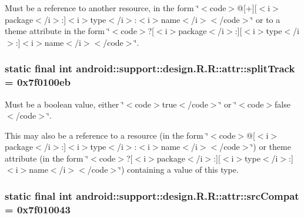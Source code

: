 Must be a reference to another resource, in the form \char`\"{}$<$code$>$@\mbox{[}+\mbox{]}\mbox{[}$<$i$>$package$<$/i$>$:\mbox{]}$<$i$>$type$<$/i$>$:$<$i$>$name$<$/i$>$$<$/code$>$\char`\"{} or to a theme attribute in the form \char`\"{}$<$code$>$?\mbox{[}$<$i$>$package$<$/i$>$:\mbox{]}\mbox{[}$<$i$>$type$<$/i$>$:\mbox{]}$<$i$>$name$<$/i$>$$<$/code$>$\char`\"{}. \hypertarget{classandroid_1_1support_1_1design_1_1_r_1_1attr_e6070dcae3cf89966842cef8a066bdf4}{
\subsubsection[{splitTrack}]{\setlength{\rightskip}{0pt plus 5cm}static final int android::support::design.R.R::attr::splitTrack = 0x7f0100eb}}
\label{classandroid_1_1support_1_1design_1_1_r_1_1attr_e6070dcae3cf89966842cef8a066bdf4}


Must be a boolean value, either \char`\"{}$<$code$>$true$<$/code$>$\char`\"{} or \char`\"{}$<$code$>$false$<$/code$>$\char`\"{}. 

This may also be a reference to a resource (in the form \char`\"{}$<$code$>$@\mbox{[}$<$i$>$package$<$/i$>$:\mbox{]}$<$i$>$type$<$/i$>$:$<$i$>$name$<$/i$>$$<$/code$>$\char`\"{}) or theme attribute (in the form \char`\"{}$<$code$>$?\mbox{[}$<$i$>$package$<$/i$>$:\mbox{]}\mbox{[}$<$i$>$type$<$/i$>$:\mbox{]}$<$i$>$name$<$/i$>$$<$/code$>$\char`\"{}) containing a value of this type. \hypertarget{classandroid_1_1support_1_1design_1_1_r_1_1attr_2b8624cd216bd1b895fc2627a3d1bcae}{
\subsubsection[{srcCompat}]{\setlength{\rightskip}{0pt plus 5cm}static final int android::support::design.R.R::attr::srcCompat = 0x7f010043}}
\label{classandroid_1_1support_1_1design_1_1_r_1_1attr_2b8624cd216bd1b895fc2627a3d1bcae}


